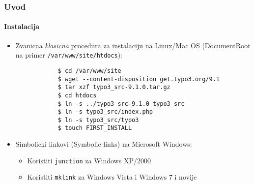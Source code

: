\begin{frame}[fragile]
	\frametitle{Uvod}
	\framesubtitle{Instalacija}

	\begin{itemize}
		\item Zvanicna \textit{klasicna} procedura za instalaciju na Linux/Mac OS\newline
			(DocumentRoot na primer \texttt{/var/www/site/htdocs}):
		\begin{lstlisting}
			$ cd /var/www/site
			$ wget --content-disposition get.typo3.org/9.1
			$ tar xzf typo3_src-9.1.0.tar.gz
			$ cd htdocs
			$ ln -s ../typo3_src-9.1.0 typo3_src
			$ ln -s typo3_src/index.php
			$ ln -s typo3_src/typo3
			$ touch FIRST_INSTALL
		\end{lstlisting}

		\item Simbolicki linkovi (Symbolic links) na Microsoft Windows:

			\begin{itemize}
				\item Koristiti \texttt{junction} za Windows XP/2000
				\item Koristiti \texttt{mklink} za Windows Vista i Windows 7 i novije
			\end{itemize}

	\end{itemize}
\end{frame}

